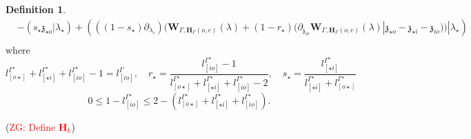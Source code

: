 \documentclass[11pt]{amsart}
\theoremstyle{definition}
\newtheorem{defn}[thm]{Definition}
\theoremstyle{remark}
\numberwithin{equation}{section}
\newcommand{\Gui}[1]{(\textcolor{red}{ZG: #1})}
\begin{document}
\begin{defn}
\begin{align*}
&-\left(s_{\star}\mathfrak{z}_{\star o}|\lambda_{\star}\right)+\left(((1-s_{\star})\partial_{\lambda_i})(\mathbf{W}_{\Gamma,\mathbf{H}_{\Gamma}(o,e)}(\lambda)+(1-r_{\star})(\partial_{\mathfrak{z}_{io}}\mathbf{W}_{\Gamma,\mathbf{H}_{\Gamma}(o,e)}(\lambda)|\mathfrak{z}_{\star o}-\mathfrak{z}_{\star i}-\mathfrak{z}_{io}))|\lambda_{\star}\right)\\
\end{align*}
where
$$
l^{\Gamma^\star}_{[ o\star]}+l^{\Gamma^\star}_{[ \star i]}+l^{\Gamma^\star}_{[ io]}-1=l^{\Gamma}_{[ io]},\quad r_{\star}=\frac{l^{\Gamma^\star}_{[ io]}-1}{l^{\Gamma^\star}_{[ o\star]}+l^{\Gamma^\star}_{[ \star i]}+l^{\Gamma^\star}_{[ io]}-2},\quad s_{\star}=\frac{l^{\Gamma^\star}_{[ \star i]}}{l^{\Gamma^\star}_{[ \star i]}+l^{\Gamma^\star}_{[ o\star ]}}
$$
$$
0\leq 1-l^{\Gamma^\star}_{[ io]}\leq 2-(l^{\Gamma^\star}_{[ o\star]}+l^{\Gamma^\star}_{[ \star i]}+l^{\Gamma^\star}_{[ io]}).
$$
\end{defn}
\Gui{Define $\mathbf{H}_k$}
\end{document}
